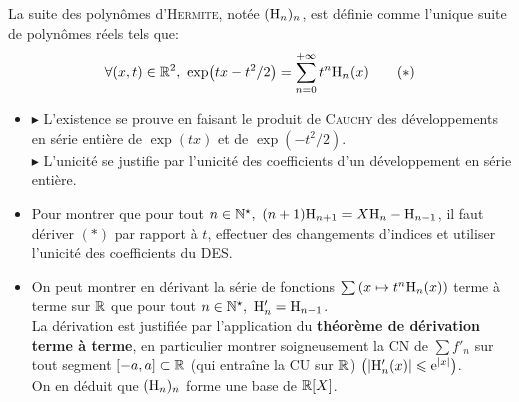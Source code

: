 \begin{defi}
    La suite des polynômes d'\textsc{Hermite}, notée $(\mathrm{H}_n)_n$, est définie comme l'unique suite de polynômes réels tels que:
    $$\forall(x, t) \in \mathbb{R}^2,\ \exp(tx-t^2/2) = \sum_{n=0}^{+\infty} t^n \mathrm{H}_n(x) \qquad (*)$$
\end{defi}

\begin{preuve}
    \begin{itemize}
    \item $\blacktriangleright$ L'existence se prouve en faisant le produit de \textsc{Cauchy} des développements en série entière de $\exp(tx)$ et de $\exp(-t^2/2)$.\\
    $\blacktriangleright$ L'unicité se justifie par l'unicité des coefficients d'un développement en série entière. 
    \item Pour montrer que pour tout $n \in \Ne,\ (n+1)\Hermite_{n+1}=X\Hermite_n-\Hermite_{n-1}$, il faut dériver $(*)$ par rapport à $t$, effectuer des changements d'indices et utiliser l'unicité des coefficients du DES. 
    \item On peut montrer en dérivant  la série de fonctions $\sum \left(x \mapsto t^n \mathrm{H}_n(x) \right)$ terme à terme sur $\mathbb{R}$ que pour tout $n \in \Ne,\ \Hermite'_n=\Hermite_{n-1}$.\\
    La dérivation est justifiée par l'application du \textbf{théorème de dérivation terme à terme}, en particulier montrer soigneusement la CN de $\sum f'_n$ sur tout segment $[-a, a] \subset \mathbb{R}$ (qui entraîne la CU sur $\mathbb{R}$) $\left(|\mathrm{H}'_n(x)| \leqslant \mathrm{e}^{|x|} \right)$.\\
    On en déduit que $(\mathrm{H}_n)_n$ forme une base de $\mathbb{R}[X]$.\\
    \end{itemize}
\end{preuve}
